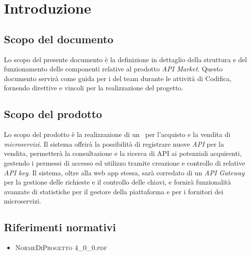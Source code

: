 \newpage
\section{Introduzione}

\subsection{Scopo del documento}
Lo scopo del presente documento è la definizione in dettaglio della struttura e del funzionamento delle componenti relative al prodotto \textit{API Market}. Questo documento servirà come guida per i \textit{\Progrs} del team \textit{\gruppo} durante le attività di Codifica, fornendo direttive e vincoli per la realizzazione del progetto.

\subsection{Scopo del prodotto}
Lo scopo del prodotto è la realizzazione di un \progetto\ per l'acquisto e la vendita di \textit{microservizi}. Il sistema offrirà la possibilità di registrare nuove \textit{API} per la vendita, permetterà la consultazione e la ricerca di API ai potenziali acquirenti, gestendo i permessi di accesso ed utilizzo tramite creazione e controllo di relative \textit{API key}. Il sistema, oltre alla web app stessa, sarà corredato di un \textit{API Gateway} per la gestione delle richieste e il controllo delle chiavi, e fornirà funzionalità avanzate di statistiche per il gestore della piattaforma e per i fornitori dei microservizi.

\subsection{Riferimenti normativi}
\begin{itemize}
	\item \textsc{NormeDiProgetto 4\_0\_0.pdf}
\end{itemize}

